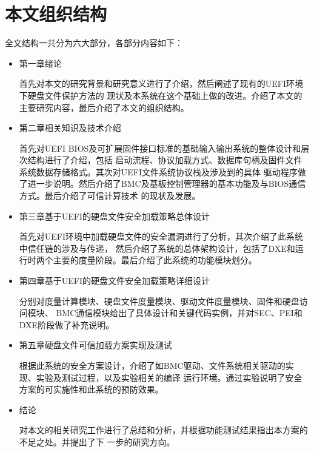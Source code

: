 \section{本文组织结构}
全文结构一共分为六大部分，各部分内容如下：
\begin{itemize}
\item 第一章\quad 绪论
\par 首先对本文的研究背景和研究意义进行了介绍，然后阐述了现有的UEFI环境下硬盘文件保护方法的
现状及本系统在这个基础上做的改进。介绍了本文的主要研究内容，最后介绍了本文的组织结构。
\item 第二章\quad 相关知识及技术介绍
\par 首先对UEFI BIOS及可扩展固件接口标准的基础输入输出系统的整体设计和层次结构进行了介绍，包括
启动流程、协议加载方式、数据库句柄及固件文件系统数据存储格式。其次对UEFI文件系统协议栈及涉及到的具体
驱动程序做了进一步说明。然后介绍了BMC及基板控制管理器的基本功能及与BIOS通信方式。最后介绍了可信计算技术
的现状及发展。
\item 第三章\quad 基于UEFI的硬盘文件安全加载策略总体设计
\par 首先对UEFI环境中加载硬盘文件的安全漏洞进行了分析，其次介绍了此系统中信任链的涉及与传递，
然后介绍了系统的总体架构设计，包括了DXE和运行时两个主要的度量阶段。最后介绍了此系统的功能模块划分。
\item 第四章\quad 基于UEFI的硬盘文件安全加载策略详细设计
\par 分别对度量计算模块、硬盘文件度量模块、驱动文件度量模块、固件和硬盘访问模块、
BMC通信模块给出了具体设计和关键代码实例，并对SEC、PEI和DXE阶段做了补充说明。
\item 第五章\quad 硬盘文件可信加载方案实现及测试
\par 根据此系统的安全方案设计，介绍了如BMC驱动、文件系统相关驱动的实现、实验及测试过程，以及实验相关的编译
运行环境。通过实验说明了安全方案的可实施性和此系统的预防效果。
\item 结论
\par 对本文的相关研究工作进行了总结和分析，并根据功能测试结果指出本方案的不足之处。并提出了下
一步的研究方向。
\end{itemize}
